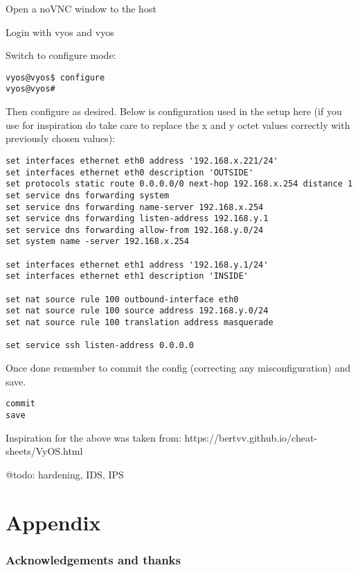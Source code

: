 \documentclass[
	11pt, %
	fleqn, %
	a4paper, %
]{LegrandOrangeBook}
\begin{document}
Open a noVNC window to the host

Login with vyos and vyos

Switch to configure mode:

\begin{verbatim}
vyos@vyos$ configure
vyos@vyos#
\end{verbatim}

Then configure as desired. Below is configuration used in the setup here
(if you use for inspiration do take care to replace the x and y octet
values correctly with previously chosen values):

\begin{verbatim}
set interfaces ethernet eth0 address '192.168.x.221/24'
set interfaces ethernet eth0 description 'OUTSIDE'
set protocols static route 0.0.0.0/0 next-hop 192.168.x.254 distance 1
set service dns forwarding system
set service dns forwarding name-server 192.168.x.254
set service dns forwarding listen-address 192.168.y.1
set service dns forwarding allow-from 192.168.y.0/24
set system name -server 192.168.x.254

set interfaces ethernet eth1 address '192.168.y.1/24'
set interfaces ethernet eth1 description 'INSIDE'

set nat source rule 100 outbound-interface eth0
set nat source rule 100 source address 192.168.y.0/24
set nat source rule 100 translation address masquerade

set service ssh listen-address 0.0.0.0
\end{verbatim}

Once done remember to commit the config (correcting any
misconfiguration) and save.

\begin{verbatim}
commit
save
\end{verbatim}

Inspiration for the above was taken from:
https://bertvv.github.io/cheat-sheets/VyOS.html

@todo: hardening, IDS, IPS


\stopcontents[part] %

\part{Appendix}
\section{Acknowledgements and thanks}
\end{document}

